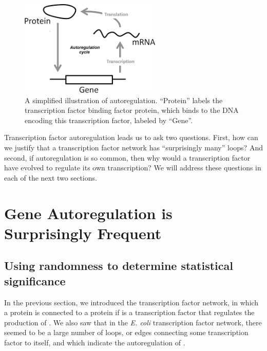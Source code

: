 \begin{figure}[h]
\centering
\mySfFamily
\includegraphics[width = 0.6\textwidth]{../images/autoregulation_example.png}
\caption{A simplified illustration of autoregulation. ``Protein'' labels the transcription factor binding factor protein, which binds to the DNA encoding this transcription factor, labeled by ``Gene''.}
\label{fig:autoregulation_example}
\end{figure}

Transcription factor autoregulation leads us to ask two questions. First, how can we justify that a transcription factor network has ``surprisingly many'' loops? And second, if autoregulation is so common, then why would a transcription factor have evolved to regulate its own transcription? We will address these questions in each of the next two sections.


\FloatBarrier
{}

\section{Gene Autoregulation is Surprisingly Frequent}
\label{sec:gene_autoregulation_is_surprisingly_frequent}

\subsection{Using randomness to determine statistical significance}

In the previous section, we introduced the transcription factor network, in which a protein  is connected to a protein  if  is a transcription factor that regulates the production of . We also saw that in the \textit{E. coli} transcription factor network, there seemed to be a large number of loops, or edges connecting some transcription factor  to itself, and which indicate the autoregulation of .

